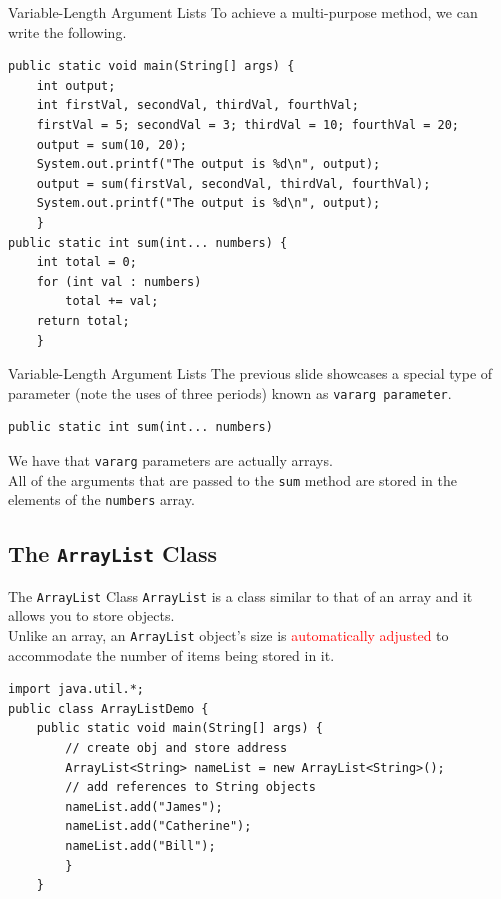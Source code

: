 \documentclass[11pt]{beamer}
\newcommand{\red}[1]{\textcolor{red}{#1}}
\begin{document}
\begin{frame}[fragile]
{Variable-Length Argument Lists}
    To achieve a multi-purpose method, we can write the following.
    \begin{lstlisting}[basicstyle=\ttfamily\footnotesize]
public static void main(String[] args) {
    int output;
    int firstVal, secondVal, thirdVal, fourthVal;
    firstVal = 5; secondVal = 3; thirdVal = 10; fourthVal = 20;
    output = sum(10, 20);
    System.out.printf("The output is %d\n", output);
    output = sum(firstVal, secondVal, thirdVal, fourthVal);
    System.out.printf("The output is %d\n", output);
    }
public static int sum(int... numbers) {
    int total = 0;
    for (int val : numbers)
        total += val;
    return total;
    }
    \end{lstlisting}
\end{frame}

\begin{frame}[fragile]
{Variable-Length Argument Lists}
    The previous slide showcases a special type of parameter (note the uses of three periods) known as \texttt{vararg parameter}.
    \begin{lstlisting}
public static int sum(int... numbers)
    \end{lstlisting}
    We have that \texttt{vararg} parameters are actually arrays. \\ \vspace{1em} 
    All of the arguments that are passed to the \texttt{sum} method are stored in the elements of the \texttt{numbers} array.
\end{frame}

\subsection{The \texttt{ArrayList} Class}
\begin{frame}[fragile]
{The \texttt{ArrayList} Class}
    \texttt{ArrayList} is a class similar to that of an array and it allows you to store objects. \\ \vspace{1em}
    Unlike an array, an \texttt{ArrayList} object’s size is \red{automatically adjusted} to accommodate the number of items being stored in it. \\ \vspace{1em}
    \begin{lstlisting}[basicstyle=\ttfamily\footnotesize]
import java.util.*;
public class ArrayListDemo {
	public static void main(String[] args) {
		// create obj and store address
		ArrayList<String> nameList = new ArrayList<String>();
		// add references to String objects
		nameList.add("James");
		nameList.add("Catherine");
		nameList.add("Bill");
		}
	}
    \end{lstlisting}    
\end{frame}
\end{document}
